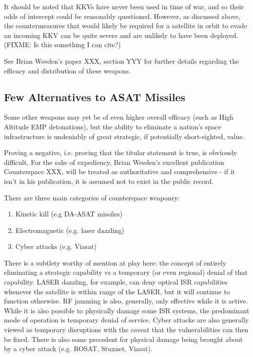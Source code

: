 It should be noted that KKVs have never been used in time of war, and
so their odds of intercept could be reasonably questioned.  However,
as discussed above, the countermeasures that would likely be required
for a satellite in orbit to evade an incoming KKV can be quite severe
and are unlikely to have been deployed.(FIXME: Is this something I can
cite?)

See Brian Weeden's paper XXX, section YYY for further details
regarding the efficacy and distribution of these weapons.

\subsection{Few Alternatives to ASAT Missiles}

Some other weapons may yet be of even higher overall efficacy (such as
High Altitude EMP detonations), but the ability to eliminate a
nation's space infrastructure is undeniably of great strategic, if
potentially short-sighted, value.

Proving a negative, i.e. proving that the titular statement is true,
is obviously difficult.  For the sake of expediency, Brian Weeden's
excellent publication Counterspace XXX, will be treated as
authoritative and comprehensive - if it isn't in his publication, it
is assumed not to exist in the public record.

There are three main categories of counterspace weaponry:
\begin{enumerate}
\item Kinetic kill (e.g DA-ASAT missiles)
\item Electromagnetic (e.g. laser dazzling)
\item Cyber attacks (e.g. Viasat)
\end{enumerate}

There is a subtlety worthy of mention at play here: the concept of
entirely eliminating a strategic capability vs a temporary (or even
regional) denial of that capability.  LASER dazzling, for example, can
deny optical ISR capabilities whenever the satellite is within range
of the LASER, but it will continue to function otherwise.  RF jamming
is also, generally, only effective while it is active.  While it is
also possible to physically damage some ISR systems, the predominant
mode of operation is temporary denial of service.  Cyber attacks are
also generally viewed as temporary disruptions with the caveat that
the vulnerabilities can then be fixed.  There is also some precedent
for physical damage being brought about by a cyber attack (e.g. ROSAT,
Stuxnet, Viasat).

